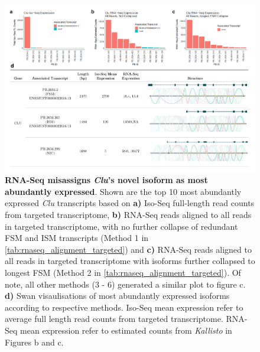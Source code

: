 \begin{landscape}
	\begin{figure}[htp]
		\centering
		\includegraphics[page=1,trim={0cm 1cm 0cm 0cm},clip,scale = 0.8]{Figures/ProjectDevelopment_Figures_Landscape.pdf}
		\captionsetup{width=1.2\textwidth,singlelinecheck=off}
		\caption[RNA-Seq misassignment of dominant isoform associated with \textit{Clu}]%
		{\textbf{RNA-Seq misassigns \textit{Clu}'s novel isoform as most abundantly expressed}. Shown are the top 10 most abundantly expressed \textit{Clu} transcripts based on \textbf{a)} Iso-Seq full-length read counts from targeted transcriptome, \textbf{b)} RNA-Seq reads aligned to all reads in targeted transcriptome, with no further collapse of redundant FSM and ISM transcripts (Method 1 in \cref{tab:rnaseq_alignment_targeted}) and \textbf{c)} RNA-Seq reads aligned to all reads in targeted transcriptome with isoforms further collapsed to longest FSM (Method 2 in \cref{tab:rnaseq_alignment_targeted}). Of note, all other methods (3 - 6) generated a similar plot to figure c. \textbf{d)} Swan visaulisations of most abundantly expressed isoforms according to respective methods. Iso-Seq mean expression refer to average full length read counts from targeted transcriptome. RNA-Seq mean expression refer to estimated counts from \textit{Kallisto} in Figures b and c. 
		}
		\label{fig:Clu_TargetedRNAseqAlignment}
	\end{figure}
	

\end{landscape}
